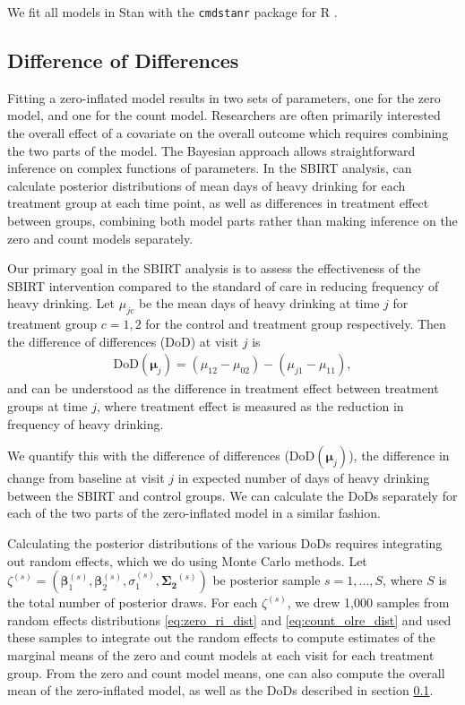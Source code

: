 \documentclass[12pt]{article}
\begin{document}
We fit all models in Stan \citep{gelman2015stan} with the \texttt{cmdstanr} package \citep{gabry2021cmdstanr} for R \citep{rsoftware}.


\subsection{Difference of Differences} \label{sec: DoD}

Fitting a zero-inflated model results in two sets of parameters, one for the zero model, and one for the count model. Researchers are often primarily interested the overall effect of a covariate on the overall outcome which requires combining the two parts of the model. The Bayesian approach allows straightforward inference on complex functions of parameters. In the SBIRT analysis, can calculate posterior distributions of mean days of heavy drinking for each treatment group at each time point, as well as differences in treatment effect between groups, combining both model parts rather than making inference on the zero and count models separately.

Our primary goal in the SBIRT analysis is to assess the effectiveness of the SBIRT intervention compared to the standard of care in reducing frequency of heavy drinking. Let $\mu_{jc}$ be the mean days of heavy drinking at time $j$ for treatment group $c=1,2$ for the control and treatment group respectively. Then the difference of differences (DoD) at visit $j$ is
\begin{align}
	\text{DoD}(\bm{\mu}_{j}) = (\mu_{12} - \mu_{02}) - (\mu_{j1}-\mu_{11}),
\end{align}
and can be understood as the difference in treatment effect between treatment groups at time $j$, where treatment effect is measured as the reduction in frequency of heavy drinking.

We quantify this with the difference of differences (DoD$(\bm{\mu}_{j})$), the difference in change from baseline at visit $j$ in expected number of days of heavy drinking between the SBIRT and control groups. We can calculate the DoDs separately for each of the two parts of the zero-inflated model in a similar fashion.

Calculating the posterior distributions of the various DoDs requires integrating out random effects, which we do using Monte Carlo methods. Let $\zeta^{(s)} = (\bm{\beta}_{1}^{(s)}, \bm{\beta}_{2}^{(s)}, \sigma_{1}^{(s)}, \bm{\Sigma_{2}}^{(s)})$ be posterior sample $s = 1, \dots, S$, where $S$ is the total number of posterior draws. For each $\zeta^{(s)}$, we drew 1,000 samples from random effects distributions \eqref{eq:zero_ri_dist} and \eqref{eq:count_olre_dist} and used these samples to integrate out the random effects to compute estimates of the marginal means of the zero and count models at each visit for each treatment group. From the zero and count model means, one can also compute the overall mean of the zero-inflated model, as well as the DoDs described in section \ref{sec: DoD}.
\end{document}
